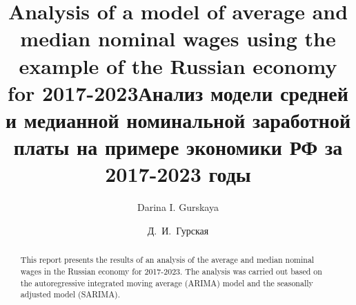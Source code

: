 \begin{englishtitle}
\title{Analysis of a model of average and median nominal wages using the example of the Russian economy for 2017-2023}
\author{Darina I. Gurskaya}

\maketitle

\begin{abstract}
This report presents the results of an analysis of the average and median nominal wages in the Russian economy for 2017-2023. The analysis was carried out based on the autoregressive integrated moving average (ARIMA) model and the seasonally adjusted model (SARIMA).

\end{abstract}
\end{englishtitle}

\iffalse
\documentclass[12pt]{llncs}
\usepackage[T2A]{fontenc}
\usepackage[utf8]{inputenc}
\usepackage[english,russian]{babel}
\usepackage[russian]{nla}




\fi

\title{Анализ модели средней и медианной номинальной заработной платы на примере экономики РФ за 2017-2023 годы%
}
\author{Д.~И.~Гурская%
} 


\maketitle


